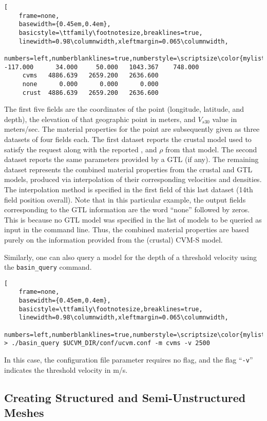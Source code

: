 \begin{lstlisting}[
	frame=none,
	basewidth={0.45em,0.4em},
	basicstyle=\ttfamily\footnotesize,breaklines=true,
	linewidth=0.98\columnwidth,xleftmargin=0.065\columnwidth,
	numbers=left,numberblanklines=true,numberstyle=\scriptsize\color{mylistingnclr}]
-117.000      34.000     50.000   1043.367    748.000    
     cvms   4886.639   2659.200   2636.600                 
     none      0.000      0.000      0.000    
     crust  4886.639   2659.200   2636.600
\end{lstlisting}

The first five fields are the coordinates of the point (longitude, latitude, and depth), the elevation of that geographic point in meters, and $V_{s30}$ value in meters/sec. The material properties for the point are subsequently given as three datasets of four fields each. The first dataset reports the crustal model used to satisfy the request along with the reported \vp{}, \vs{} and $\rho$ from that model. The second dataset reports the same parameters provided by a GTL (if any). The remaining dataset represents the combined material properties from the crustal and GTL models, produced via interpolation of their corresponding velocities and densities. The interpolation method is specified in the first field of this last dataset (14th field position overall). Note that in this particular example, the output fields corresponding to the GTL information are the word ``none'' followed by zeros. This is because no GTL model was specified in the list of models to be queried as input in the command line. Thus, the combined material properties are based purely on the information provided from the (crustal) CVM-S model.

Similarly, one can also query a model for the depth of a threshold velocity using the \texttt{basin\_query} command.

\begin{lstlisting}[
	frame=none,
	basewidth={0.45em,0.4em},
	basicstyle=\ttfamily\footnotesize,breaklines=true,
	linewidth=0.98\columnwidth,xleftmargin=0.065\columnwidth,
	numbers=left,numberblanklines=true,numberstyle=\scriptsize\color{mylistingnclr}]
> ./basin_query $UCVM_DIR/conf/ucvm.conf -m cvms -v 2500
\end{lstlisting}

\noindent
In this case, the configuration file parameter requires no flag, and the flag ``\texttt{-v}'' indicates the threshold \vs{} velocity in m/s.

\subsection{Creating Structured and Semi-Unstructured Meshes}

